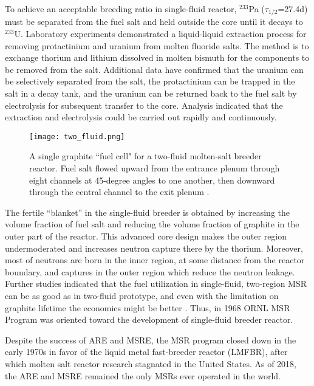 To achieve an acceptable breeding ratio in single-fluid reactor, $^{233}$Pa ($\tau_{1/2}$=27.4d) must be separated from the fuel salt and held outside the core until it decays to $^{233}$U. Laboratory experiments demonstrated a liquid-liquid extraction process for removing protactinium and uranium from molten fluoride salts. The method is to exchange thorium and lithium dissolved in molten bismuth for the components to be removed from the salt. Additional data have confirmed that the uranium can be selectively separated from the salt, the protactinium can be trapped in the salt in a decay tank, and the uranium can be returned back to the fuel salt by electrolysis for subsequent transfer to the core. Analysis indicated that the extraction and electrolysis could be carried out rapidly and continuously.

\begin{figure}[htp!] %
  \centering
  \vspace{-0.3em}
  \texttt{[image: two\_fluid.png]}
  \caption{A single graphite ``fuel cell" for a two-fluid molten-salt breeder reactor. Fuel salt flowed upward from the entrance plenum through eight channels at 45-degree angles to one another, then downward through the central channel to the exit plenum \cite{briggs_molten-salt_1966}.}
  \vspace{-0.6em}
  \label{fig:two_fluid}
\end{figure}
\FloatBarrier

The fertile ``blanket'' in the single-fluid breeder is obtained by increasing the volume fraction of fuel salt and reducing the volume fraction of graphite in the outer part of the reactor. This advanced core design makes the outer region undermoderated and increases neutron capture there by the thorium. Moreover, most of neutrons are born in the inner region, at some distance from the reactor boundary, and captures in the outer region which reduce the neutron leakage. Further studies indicated that the fuel utilization in single-fluid, two-region \gls{MSR} can be as good as in two-fluid prototype, and even with the limitation on graphite lifetime the economics might be better \cite{rosenthal_molten-salt_1970}. Thus, in 1968 \gls{ORNL} \gls{MSR} Program was oriented toward the development of single-fluid breeder reactor.

Despite the success of \gls{ARE} and \gls{MSRE}, the \gls{MSR} program closed down in the early 1970s in favor of the liquid metal fast-breeder reactor (LMFBR),\cite{macpherson_molten_1985} after which molten salt reactor research stagnated in the United States. As of 2018, the \gls{ARE} and \gls{MSRE} remained the only \glspl{MSR} ever operated in the world.

